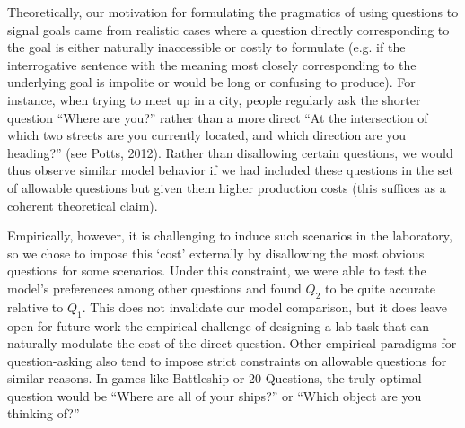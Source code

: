 \documentclass[11pt, floatsintext]{apa6}
\begin{document}
Theoretically, our motivation for formulating the pragmatics of using questions to signal goals came from realistic cases where a question directly corresponding to the goal is either naturally inaccessible or costly to formulate (e.g. if the interrogative sentence with the meaning most closely corresponding to the underlying goal is impolite or would be long or confusing to produce). 
For instance, when trying to meet up in a city, people regularly ask the shorter question “Where are you?” rather than a more direct “At the intersection of which two streets are you currently located, and which direction are you heading?” (see Potts, 2012). 
Rather than disallowing certain questions, we would thus observe similar model behavior if we had included these questions in the set of allowable questions but given them higher production costs (this suffices as a coherent theoretical claim). 

Empirically, however, it is challenging to induce such scenarios in the laboratory, so we chose to impose this ‘cost’ externally by disallowing the most obvious questions for some scenarios. 
Under this constraint, we were able to test the model’s preferences among other questions and found $Q_2$ to be quite accurate relative to $Q_1$. 
This does not invalidate our model comparison, but it does leave open for future work the empirical challenge of designing a lab task that can naturally modulate the cost of the direct question. 
Other empirical paradigms for question-asking also tend to impose strict constraints on allowable questions for similar reasons. 
In games like Battleship or 20 Questions, the truly optimal question would be ``Where are all of your ships?'' or ``Which object are you thinking of?''
\end{document}
